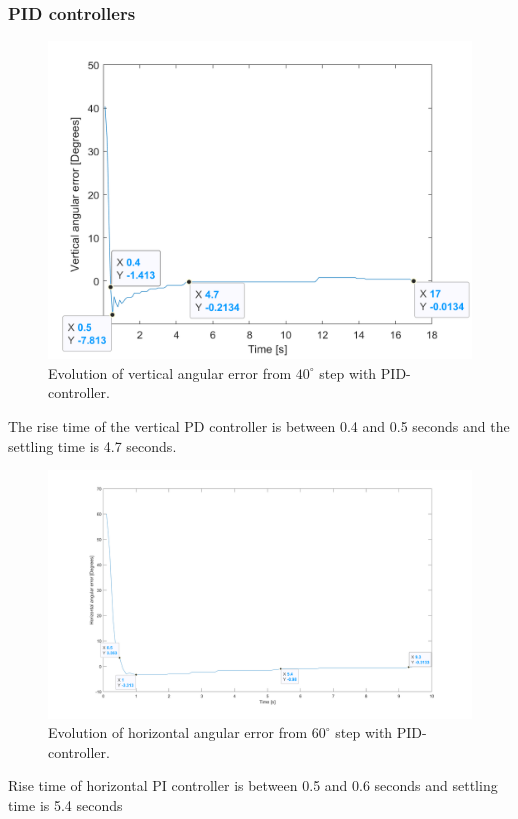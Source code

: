 \subsubsection{PID controllers}
\begin{figure}[H]
\centering
\includegraphics[width=\textwidth]{assets/Vertical_PID_controller.png}
\caption{Evolution of vertical angular error from \(40^{\circ}\) step with PID-controller.}
\label{vert_P}
\end{figure}
The rise time of the vertical PD controller is between 0.4 and 0.5 seconds and the settling time is 4.7 seconds.
\begin{figure}[H]
\centering
\includegraphics[width=\textwidth]{assets/Horizontal_PID_controller.png}
\caption{Evolution of horizontal angular error from \(60^{\circ}\) step with PID-controller.}
\label{vert_P}
\end{figure}
Rise time of horizontal PI controller is between 0.5 and 0.6 seconds and settling time is 5.4 seconds

